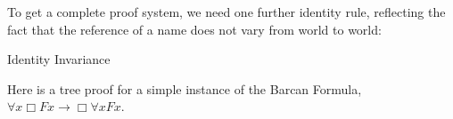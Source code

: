 To get a complete proof system, we need one further identity rule, reflecting
the fact that the reference of a name does not vary from world to world:

\medskip
\begin{center}
  \begin{minipage}[t]{0.3\textwidth} \centering

    Identity Invariance
    
    \bigskip
  \end{minipage}
\end{center}
\bigskip

%
%
%
%
%
%

Here is a tree proof for a simple instance of the Barcan Formula,
$\forall x \Box Fx \to \Box \forall x Fx$.

\medskip
\begin{center}
\end{center}
\medskip

